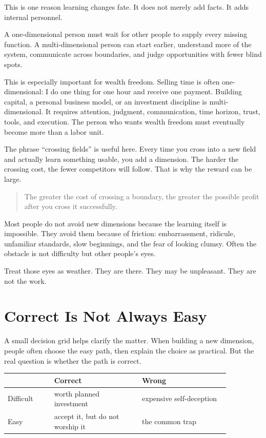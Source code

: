This is one reason learning changes fate. It does not merely add facts. It adds internal personnel.

A one-dimensional person must wait for other people to supply every missing function. A multi-dimensional person can start earlier, understand more of the system, communicate across boundaries, and judge opportunities with fewer blind spots.

This is especially important for wealth freedom. Selling time is often one-dimensional: I do one thing for one hour and receive one payment. Building capital, a personal business model, or an investment discipline is multi-dimensional. It requires attention, judgment, communication, time horizon, trust, tools, and execution. The person who wants wealth freedom must eventually become more than a labor unit.

The phrase ``crossing fields'' is useful here. Every time you cross into a new field and actually learn something usable, you add a dimension. The harder the crossing cost, the fewer competitors will follow. That is why the reward can be large.

\begin{quote}
The greater the cost of crossing a boundary, the greater the possible profit after you cross it successfully.
\end{quote}

Most people do not avoid new dimensions because the learning itself is impossible. They avoid them because of friction: embarrassment, ridicule, unfamiliar standards, slow beginnings, and the fear of looking clumsy. Often the obstacle is not difficulty but other people's eyes.

Treat those eyes as weather. They are there. They may be unpleasant. They are not the work.

\section*{Correct Is Not Always Easy}

A small decision grid helps clarify the matter. When building a new dimension, people often choose the easy path, then explain the choice as practical. But the real question is whether the path is correct.

\begin{center}
\begin{tabular}{p{0.18\linewidth}p{0.34\linewidth}p{0.34\linewidth}}
\hline
 & Correct & Wrong \\
\hline
Difficult & worth planned investment & expensive self-deception \\
Easy & accept it, but do not worship it & the common trap \\
\hline
\end{tabular}
\end{center}

